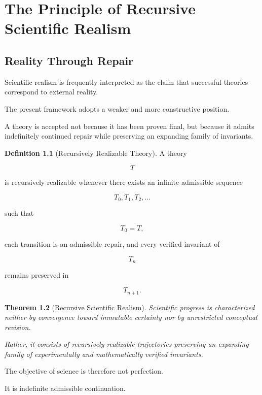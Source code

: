 \documentclass[11pt,oneside]{book}
\numberwithin{equation}{chapter}
\theoremstyle{definition}
\newtheorem{definition}{Definition}[chapter]
\theoremstyle{plain}
\newtheorem{theorem}[definition]{Theorem}
\begin{document}
\chapter{The Principle of Recursive Scientific Realism}

\section{Reality Through Repair}

Scientific realism is frequently interpreted as the claim that successful
theories correspond to external reality.

The present framework adopts a weaker and more constructive position.

A theory is accepted not because it has been proven final, but because it
admits indefinitely continued repair while preserving an expanding family of
invariants.

\begin{definition}[Recursively Realizable Theory]

A theory

\[
T
\]

is recursively realizable whenever there exists an infinite admissible
sequence

\[
T_0,
T_1,
T_2,
\ldots
\]

such that

\[
T_0=T,
\]

each transition is an admissible repair, and every verified invariant of

\[
T_n
\]

remains preserved in

\[
T_{n+1}.
\]

\end{definition}

\begin{theorem}[Recursive Scientific Realism]

Scientific progress is characterized neither by convergence toward immutable
certainty nor by unrestricted conceptual revision.

Rather, it consists of recursively realizable trajectories preserving an
expanding family of experimentally and mathematically verified invariants.

\end{theorem}

The objective of science is therefore not perfection.

It is indefinite admissible continuation.
\end{document}
